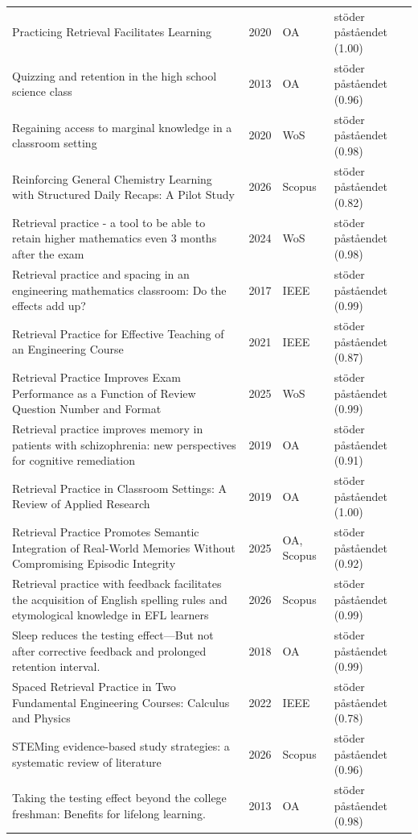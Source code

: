 \begin{longtable}{@{}%
  >{\raggedright\arraybackslash}p{}c%
  >{\raggedright\arraybackslash}p{}%
  >{\raggedright\arraybackslash}p{}@{}}
Practicing Retrieval Facilitates Learning & 2020 & OA & stöder påståendet (1.00) \\
Quizzing and retention in the high school science class & 2013 & OA & stöder påståendet (0.96) \\
Regaining access to marginal knowledge in a classroom setting & 2020 & WoS & stöder påståendet (0.98) \\
Reinforcing General Chemistry Learning with Structured Daily Recaps: A Pilot Study & 2026 & Scopus & stöder påståendet (0.82) \\
Retrieval practice - a tool to be able to retain higher mathematics even 3 months after the exam & 2024 & WoS & stöder påståendet (0.98) \\
Retrieval practice and spacing in an engineering mathematics classroom: Do the effects add up? & 2017 & IEEE & stöder påståendet (0.99) \\
Retrieval Practice for Effective Teaching of an Engineering Course & 2021 & IEEE & stöder påståendet (0.87) \\
Retrieval Practice Improves Exam Performance as a Function of Review Question Number and Format & 2025 & WoS & stöder påståendet (0.99) \\
Retrieval practice improves memory in patients with schizophrenia: new perspectives for cognitive remediation & 2019 & OA & stöder påståendet (0.91) \\
Retrieval Practice in Classroom Settings: A Review of Applied Research & 2019 & OA & stöder påståendet (1.00) \\
Retrieval Practice Promotes Semantic Integration of Real-World Memories Without Compromising Episodic Integrity & 2025 & OA, Scopus & stöder påståendet (0.92) \\
Retrieval practice with feedback facilitates the acquisition of English spelling rules and etymological knowledge in EFL learners & 2026 & Scopus & stöder påståendet (0.99) \\
Sleep reduces the testing effect---But not after corrective feedback and prolonged retention interval. & 2018 & OA & stöder påståendet (0.99) \\
Spaced Retrieval Practice in Two Fundamental Engineering Courses: Calculus and Physics & 2022 & IEEE & stöder påståendet (0.78) \\
STEMing evidence-based study strategies: a systematic review of literature & 2026 & Scopus & stöder påståendet (0.96) \\
Taking the testing effect beyond the college freshman: Benefits for lifelong learning. & 2013 & OA & stöder påståendet (0.98) \\

\end{longtable}

